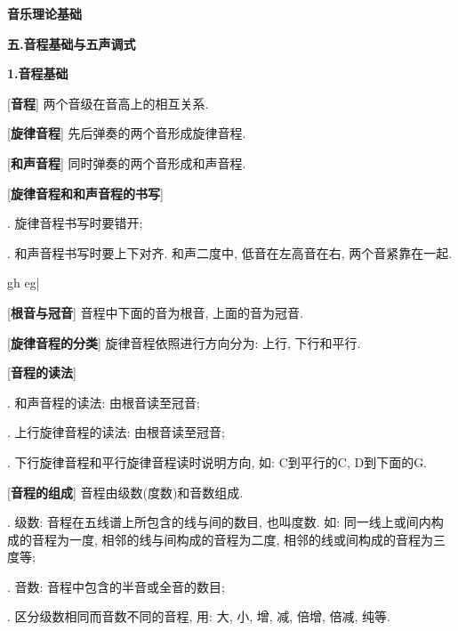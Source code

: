

\begin{center} 
 \Large \textbf{音乐理论基础}\par
 \textbf{五.音程基础与五声调式}
\end{center}

\large 
\begin{center}
 \textbf{1.音程基础}\\
\end{center}

[\textbf{音程}] 两个音级在音高上的相互关系.\par

[\textbf{旋律音程}] 先后弹奏的两个音形成旋律音程.\par

[\textbf{和声音程}] 同时弹奏的两个音形成和声音程.\par

[\textbf{旋律音程和和声音程的书写}] \par
{}. 旋律音程书写时要错开;\par 
{}. 和声音程书写时要上下对齐. 和声二度中, 低音在左高音在右, 两个音紧靠在一起.\par
\startextract
\Notes \wh g\wh h\en
\Notes \wh e\wh g\en\bar
\Notes {}\en
\Notes {}\en
\zendextract

[\textbf{根音与冠音}] 音程中下面的音为根音, 上面的音为冠音.\par

[\textbf{旋律音程的分类}] 旋律音程依照进行方向分为: 上行, 下行和平行.\par

[\textbf{音程的读法}]\par
{}. 和声音程的读法: 由根音读至冠音;\par
{}. 上行旋律音程的读法: 由根音读至冠音;\par
{}. 下行旋律音程和平行旋律音程读时说明方向, 如: C到平行的C, D到下面的G.\par

[\textbf{音程的组成}] 音程由级数(度数)和音数组成.\par
{}. 级数: 音程在五线谱上所包含的线与间的数目, 也叫度数. 如: 同一线上或间内构成的音程为一度, 相邻的线与间构成的音程为二度, 相邻的线或间构成的音程为三度等;\par
{}. 音数: 音程中包含的半音或全音的数目;\par
{}. 区分级数相同而音数不同的音程, 用: 大, 小, 增, 减, 倍增, 倍减, 纯等.\par

